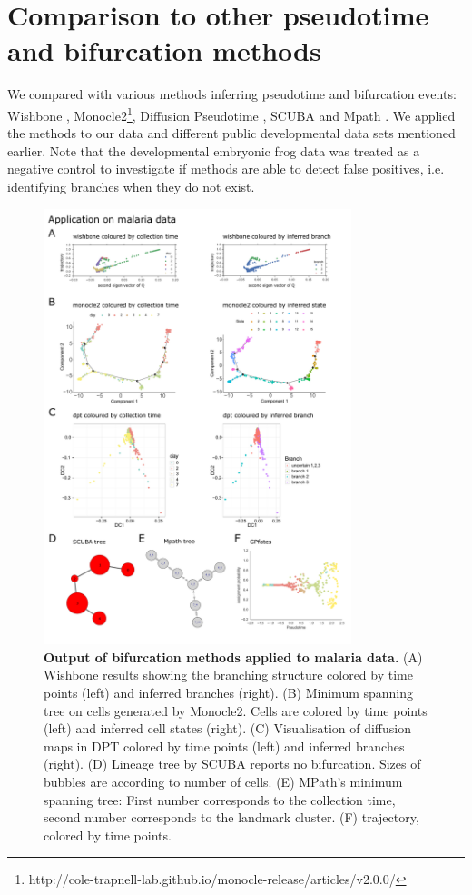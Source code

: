 \section{Comparison to other pseudotime and bifurcation methods} \label{sec:bif-comparison}

We compared  with various methods inferring pseudotime and bifurcation events: Wishbone \cite{Setty2016-ie}, Monocle2\footnote{http://cole-trapnell-lab.github.io/monocle-release/articles/v2.0.0/}, Diffusion Pseudotime \cite{Haghverdi2016-tm}, SCUBA \cite{Marco2014-rf} and Mpath \cite{Chen2016-ar}. We applied the methods to our data and different public developmental data sets mentioned earlier. Note that the developmental embryonic frog data was treated as a negative control to investigate if methods are able to detect false positives, i.e. identifying branches when they do not exist.

\begin{figure}
    \centering
    \includegraphics[width=0.8\textwidth]{"results_malaria"}
    \caption[Output of bifurcation methods applied to malaria data]{\textbf{Output of bifurcation methods applied to malaria data.} (A) Wishbone results showing the branching structure colored by time points (left) and inferred branches (right). (B) Minimum spanning tree on cells generated by Monocle2. Cells are colored by time points (left) and inferred cell states (right). (C) Visualisation of diffusion maps in DPT colored by time points (left) and inferred branches (right). (D) Lineage tree by SCUBA reports no bifurcation. Sizes of bubbles are according to number of cells. (E) MPath's minimum spanning tree: First number corresponds to the collection time, second number corresponds to the landmark cluster. (F)  trajectory, colored by time points.}
    \label{fig:res_malaria}
\end{figure}

